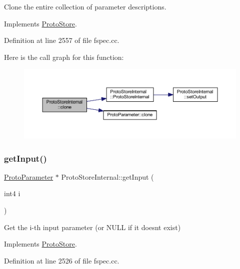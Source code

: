 Clone the entire collection of parameter descriptions. 



Implements \mbox{\hyperlink{class_proto_store_aaefd44fa7803bbeb4d91059cc6480419}{Proto\+Store}}.



Definition at line 2557 of file fspec.\+cc.

Here is the call graph for this function\+:
\nopagebreak
\begin{figure}[H]
\begin{center}
\leavevmode
\includegraphics[width=350pt]{class_proto_store_internal_ac14aea73b6e7381a6751a1bcf98c1930_cgraph}
\end{center}
\end{figure}
\mbox{\label{class_proto_store_internal_ab637f859e1c4553e24d4651836ce7c84}} 
\subsubsection{\texorpdfstring{getInput()}{getInput()}}
{\footnotesize\ttfamily \mbox{\hyperlink{class_proto_parameter}{Proto\+Parameter}} $\ast$ Proto\+Store\+Internal\+::get\+Input (\begin{DoxyParamCaption}\item[{int4}]{i }\end{DoxyParamCaption})\hspace{0.3cm}{\ttfamily [virtual]}}



Get the i-\/th input parameter (or N\+U\+LL if it doesn\textquotesingle{}t exist) 



Implements \mbox{\hyperlink{class_proto_store_a97623d0ed5720f94d7c671edccbd9142}{Proto\+Store}}.



Definition at line 2526 of file fspec.\+cc.

